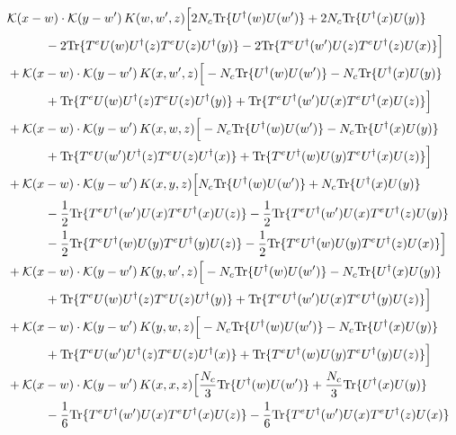 \documentclass[10pt]{article}
\numberwithin{equation}{section}
\begin{document}
\begin{align}
&\mathcal K(x-w)\cdot\mathcal K(y-w')\,K(w,w',z)\Big[2 N_c{\rm Tr}\{U^\dagger(w)U(w')\}+2 N_c{\rm Tr}\{U^\dagger(x)U(y)\}\notag\\
&\quad\quad\quad-2{\rm Tr}\{T^eU(w)U^\dagger(z)T^eU(z)U^\dagger(y)\}-2{\rm Tr}\{T^eU^\dagger(w')U(z)T^eU^\dagger(z)U(x)\}\Big]\notag\\
&+\mathcal K(x-w)\cdot\mathcal K(y-w')\,K(x,w',z)\Big[-N_c{\rm Tr}\{U^\dagger(w)U(w')\}-N_c{\rm Tr}\{U^\dagger(x)U(y)\}\notag\\
&\quad\quad\quad+{\rm Tr}\{T^eU(w)U^\dagger(z)T^eU(z)U^\dagger(y)\}+{\rm Tr}\{T^eU^\dagger(w')U(x)T^eU^\dagger(x)U(z)\}\Big]\notag\\
&+\mathcal K(x-w)\cdot\mathcal K(y-w')\,K(x,w,z)\Big[-N_c{\rm Tr}\{U^\dagger(w)U(w')\}-N_c{\rm Tr}\{U^\dagger(x)U(y)\}\notag\\
&\quad\quad\quad+{\rm Tr}\{T^eU(w')U^\dagger(z)T^eU(z)U^\dagger(x)\}+{\rm Tr}\{T^eU^\dagger(w)U(y)T^eU^\dagger(x)U(z)\}\Big]\notag\\
&+\mathcal K(x-w)\cdot\mathcal K(y-w')\,K(x,y,z)\Big[N_c{\rm Tr}\{U^\dagger(w)U(w')\}+N_c{\rm Tr}\{U^\dagger(x)U(y)\}\notag\\
&\quad\quad\quad-\frac{1}{2}{\rm Tr}\{T^eU^\dagger(w')U(x)T^eU^\dagger(x)U(z)\}-\frac{1}{2}{\rm Tr}\{T^eU^\dagger(w')U(x)T^eU^\dagger(z)U(y)\}\notag\\
&\quad\quad\quad-\frac{1}{2}{\rm Tr}\{T^eU^\dagger(w)U(y)T^eU^\dagger(y)U(z)\}-\frac{1}{2}{\rm Tr}\{T^eU^\dagger(w)U(y)T^eU^\dagger(z)U(x)\}\Big]\notag\\
&+\mathcal K(x-w)\cdot\mathcal K(y-w')\,K(y,w',z)\Big[-N_c{\rm Tr}\{U^\dagger(w)U(w')\}-N_c{\rm Tr}\{U^\dagger(x)U(y)\}\notag\\
&\quad\quad\quad+{\rm Tr}\{T^eU(w)U^\dagger(z)T^eU(z)U^\dagger(y)\}+{\rm Tr}\{T^eU^\dagger(w')U(x)T^eU^\dagger(y)U(z)\}\Big]\notag\\
&+\mathcal K(x-w)\cdot\mathcal K(y-w')\,K(y,w,z)\Big[-N_c{\rm Tr}\{U^\dagger(w)U(w')\}-N_c{\rm Tr}\{U^\dagger(x)U(y)\}\notag\\
&\quad\quad\quad+{\rm Tr}\{T^eU(w')U^\dagger(z)T^eU(z)U^\dagger(x)\}+{\rm Tr}\{T^eU^\dagger(w)U(y)T^eU^\dagger(y)U(z)\}\Big]\notag\\
&+\mathcal K(x-w)\cdot\mathcal K(y-w')\,K(x,x,z)\Big[\frac{N_c}{3}{\rm Tr}\{U^\dagger(w)U(w')\}+\frac{N_c}{3}{\rm Tr}\{U^\dagger(x)U(y)\}\notag\\
&\quad\quad\quad-\frac{1}{6}{\rm Tr}\{T^eU^\dagger(w')U(x)T^eU^\dagger(x)U(z)\}-\frac{1}{6}{\rm Tr}\{T^eU^\dagger(w')U(x)T^eU^\dagger(z)U(x)\}\notag\\

\end{align}
\end{document}
